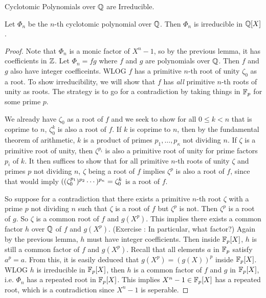 \documentclass[../book.tex]{subfiles}
\begin{document}
\begin{thm} Cyclotomic Polynomials over $\mathbb{Q}$ are Irreducible.
    
    Let $\Phi_n$ be the $n$-th cyclotomic polynomial over $\mathbb{Q}$.
    Then $\Phi_n$ is irreducible in $\mathbb{Q}[X]$.
    
\end{thm}
\begin{proof}
    
    Note that $\Phi_n$ is a monic factor of $X^n - 1$,
    so by the previous lemma, it has coefficients in $\mathbb{Z}$.
    Let $\Phi_n = f g$ where $f$ and $g$ are polynomials over $\mathbb{Q}$.
    Then $f$ and $g$ also have integer coefficeints.
    WLOG $f$ has a primitive $n$-th root of unity $\zeta_0$ as a root.
    To show irreducibility, 
    we will show that $f$ has \emph{all} primitive $n$-th roots of unity as roots.
    The strategy is to go for a contradiction by taking things in $\mathbb{F}_p$
    for some prime $p$.
    
    We already have $\zeta_0$ as a root of $f$ and we seek to show
    for all $0 \leq k < n$ that is coprime to $n$, $\zeta_0^k$ is also a root of $f$.
    If $k$ is coprime to $n$, then by the fundamental theorem of arithmetic,
    $k$ is a product of primes $p_1, \dots, p_\kappa$ not dividing $n$. 
    If $\zeta$ is a primitive root of unity, 
    then $\zeta^{p_i}$ is also a primitive root of unity 
    for prime factors $p_i$ of $k$.
    It then suffices to show that for all primitive $n$-th roots of unity $\zeta$
    and primes $p$ not dividing $n$, 
    $\zeta$ being a root of $f$ implies $\zeta^p$ is also a root of $f$,
    since that would imply $((\zeta_0^{p_1})^{p_2}\cdots )^{p_\kappa} = \zeta_0^k$
    is a root of $f$. 
    
    So suppose for a contradiction that there exists a primitive $n$-th root $\zeta$
    with a prime $p$ not dividing $n$ such that 
    $\zeta$ is a root of $f$ but $\zeta^p$ is not.
    Then $\zeta^p$ is a root of $g$.
    So $\zeta$ is a common root of $f$ and $g(X^p)$.
    This implies there exists a common factor $h$ over $\mathbb{Q}$ of $f$ and $g(X^p)$.
    (Exercise : In particular, what factor?)
    Again by the previous lemma, $h$ must have integer coefficients.
    Then inside $\mathbb{F}_p[X]$, $h$ is still a common factor of $f$ and $g(X^p)$.
    Recall that all elements $a$ in $\mathbb{F}_p$ satisfy $a^p = a$. 
    From this, it is easily deduced that $g(X^p) = (g(X))^p$ inside $\mathbb{F}_p[X]$.
    WLOG $h$ is irreducible in $\mathbb{F}_p[X]$,
    then $h$ is a common factor of $f$ and $g$ in $\mathbb{F}_p[X]$,
    i.e. $\Phi_n$ has a repeated root in $\mathbb{F}_p[X]$.
    This implies $X^n - 1 \in \mathbb{F}_p[X]$ has a repeated root,
    which is a contradiction since $X^n - 1$ is seperable.
    
\end{proof}
\end{document}
